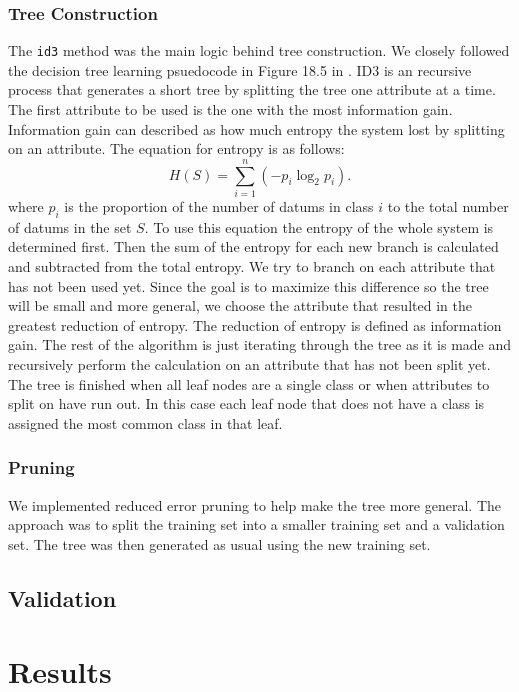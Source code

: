 \documentclass{article}
\begin{document}
	\subsubsection{Tree Construction}
	The \texttt{id3} method was the main logic behind tree construction. We closely followed the decision tree learning psuedocode in Figure 18.5 in \cite{ai}. 
	ID3 is an recursive process that generates a short tree by splitting the tree one attribute at a time. 
	The first attribute to be used is the one with the most information gain. 
	Information gain can described as how much entropy the system lost by splitting on an attribute. 
	The equation for entropy is as follows:
	\begin{equation*}
		H(S) = \sum_{i=1}^{n} \left( -p_i \log_2 p_i \right). 
	\end{equation*}		
	where $p_i$ is the proportion of the number of datums in class $i$ to the total number of datums in the set $S$. 
	To use this equation the entropy of the whole system is determined first. 
	Then the sum of the entropy for each new branch is calculated and subtracted from the total entropy. We try to branch on each attribute that has not been used yet. Since the goal is to maximize this difference so the tree will be small and more general, we choose the attribute that resulted in the greatest reduction of entropy. The reduction of entropy is defined as information gain.
	The rest of the algorithm is just iterating through the tree as it is made and recursively perform the calculation on an attribute that has not been split yet. 
	The tree is finished when all leaf nodes are a single class or when attributes to split on have run out.
	In this case each leaf node that does not have a class is assigned the most common class in that leaf.
	\subsubsection{Pruning}
	We implemented reduced error pruning to help make the tree more general. The approach was to split the training set into a smaller training set and a validation set. The tree was then generated as usual using the new training set. 
	\subsection{Validation}
\section{Results}
\end{document}
